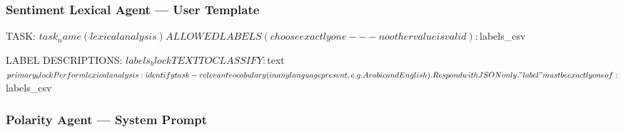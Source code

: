 \subsubsection{Sentiment Lexical Agent --- User Template}

\begin{Prompt}
TASK: $task_name (lexical analysis)

ALLOWED LABELS (choose exactly one --- no other value is valid):
$labels_csv

LABEL DESCRIPTIONS:
$labels_block

TEXT TO CLASSIFY:
$text
$primary_block
Perform lexical analysis: identify task-relevant vocabulary
(in any language present, e.g. Arabic and English).
Respond with JSON only. "label" must be exactly one of: $labels_csv
\end{Prompt}


\subsubsection{Polarity Agent --- System Prompt}

